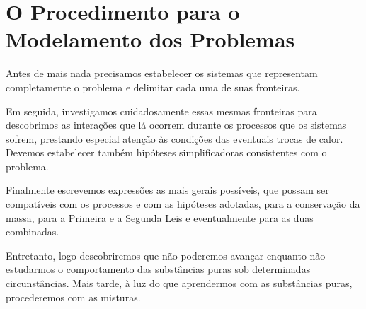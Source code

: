     \section{O Procedimento para o Modelamento dos Problemas}

    Antes de mais nada precisamos estabelecer os sistemas que representam
    completamente o problema e delimitar cada uma de suas fronteiras.

    Em seguida, investigamos cuidadosamente essas mesmas fronteiras para
    descobrimos as interações que lá ocorrem durante os processos que os
    sistemas sofrem, prestando especial atenção às condições das eventuais
    trocas de calor. Devemos estabelecer também hipóteses simplificadoras
    consistentes com o problema.

    Finalmente escrevemos expressões as mais gerais possíveis, que possam ser
    compatíveis com os processos e com as hipóteses adotadas, para a
    conservação da massa, para a Primeira e a Segunda Leis e eventualmente para
    as duas combinadas.

    Entretanto, logo descobriremos que não poderemos avançar enquanto não
    estudarmos o comportamento das substâncias puras sob determinadas
    circunstâncias. Mais tarde, à luz do que aprendermos com as substâncias
    puras, procederemos com as misturas.
